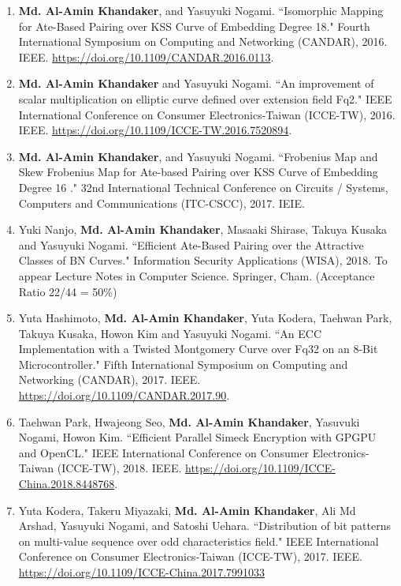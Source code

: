 \begin{itemize}
\begin{enumerate}
	\item \textbf{Md. Al-Amin Khandaker}, and Yasuyuki Nogami. ``Isomorphic Mapping for Ate-Based Pairing over KSS Curve of Embedding Degree 18." Fourth International Symposium on Computing and Networking (CANDAR), 2016. IEEE. \url{https://doi.org/10.1109/CANDAR.2016.0113}.
	
	\item \textbf{Md. Al-Amin Khandaker} and Yasuyuki Nogami. ``An improvement of scalar multiplication on elliptic curve defined over extension field Fq2." IEEE International Conference on Consumer Electronics-Taiwan (ICCE-TW), 2016. IEEE. \url{https://doi.org/10.1109/ICCE-TW.2016.7520894}.
	
	\item \textbf{Md. Al-Amin Khandaker}, and Yasuyuki Nogami. ``Frobenius Map and Skew Frobenius Map for Ate-based Pairing over KSS Curve of Embedding Degree 16 ." 32nd International Technical Conference on Circuits / Systems, Computers and Communications (ITC-CSCC), 2017. IEIE.
	
	
	\item Yuki Nanjo, \textbf{Md. Al-Amin Khandaker}, Masaaki Shirase, Takuya Kusaka and Yasuyuki Nogami. ``Efficient Ate-Based Pairing over the Attractive Classes of BN Curves." Information Security Applications (WISA), 2018. To appear Lecture Notes in Computer Science. Springer, Cham. (Acceptance Ratio 22/44 = 50\%)
	
	\item	Yuta Hashimoto, \textbf{Md. Al-Amin Khandaker}, Yuta Kodera, Taehwan Park, Takuya Kusaka, Howon Kim and Yasuyuki Nogami. ``An ECC Implementation with a Twisted Montgomery Curve over Fq32 on an 8-Bit Microcontroller." Fifth International Symposium on Computing and Networking (CANDAR), 2017. IEEE. \url{https://doi.org/10.1109/CANDAR.2017.90}.
	
	\item Taehwan Park, Hwajeong Seo, \textbf{Md. Al-Amin Khandaker}, Yasuvuki Nogami, Howon Kim. ``Efficient Parallel Simeck Encryption with GPGPU and OpenCL." IEEE International Conference on Consumer Electronics-Taiwan (ICCE-TW), 2018. IEEE.  \url{https://doi.org/10.1109/ICCE-China.2018.8448768}.
	
	\item Yuta Kodera, Takeru Miyazaki, \textbf{Md. Al-Amin Khandaker}, Ali Md Arshad, Yasuyuki Nogami, and Satoshi Uehara. ``Distribution of bit patterns on multi-value sequence over odd characteristics field." IEEE International Conference on Consumer Electronics-Taiwan (ICCE-TW), 2017. IEEE.  \url{https://doi.org/10.1109/ICCE-China.2017.7991033} 
	

\end{enumerate}
\end{itemize}
